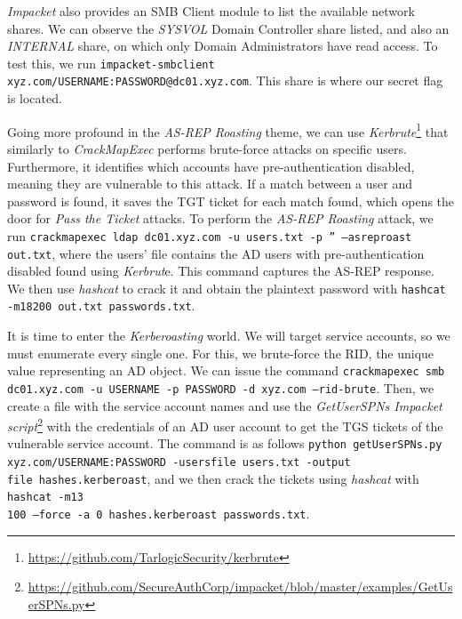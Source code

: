\textit{Impacket} also provides an SMB Client module to list the available network shares. We can observe the \textit{SYSVOL} Domain Controller share listed, and also an \textit{INTERNAL} share, on which only Domain Administrators have read access. To test this, we run \texttt{impacket-smbclient xyz.com/USERNAME:PASSWORD@dc01.xyz.com}. This share is where our secret flag is located. 

Going more profound in the \textit{AS-REP Roasting} theme, we can use \textit{Kerbrute}\footnote{\url{https://github.com/TarlogicSecurity/kerbrute}} that similarly to \textit{CrackMapExec} performs brute-force attacks on specific users. Furthermore, it identifies which accounts have pre-authentication disabled, meaning they are vulnerable to this attack. If a match between a user and password is found, it saves the TGT ticket for each match found, which opens the door for \textit{Pass the Ticket} attacks. To perform the \textit{AS-REP Roasting} attack, we run \texttt{crackmapexec ldap dc01.xyz.com -u users.txt -p '' ---asreproast out.txt}, where the users' file contains the AD users with pre-authentication disabled found using \textit{Kerbrut}e. This command captures the AS-REP response. We then use \textit{hashcat} to crack it and obtain the plaintext password with \texttt{hashcat -m18200 out.txt passwords.txt}. 

It is time to enter the \textit{Kerberoasting} world. We will target service accounts, so we must enumerate every single one. For this, we brute-force the RID, the unique value representing an AD object. We can issue the command \texttt{crackmapexec smb dc01.xyz.com -u USERNAME -p PASSWORD -d xyz.com ---rid-brute}. Then, we create a file with the service account names and use the \textit{GetUserSPNs Impacket script}\footnote{\url{https://github.com/SecureAuthCorp/impacket/blob/master/examples/GetUserSPNs.py}} with the credentials of an AD user account to get the TGS tickets of the vulnerable service account. The command is as follows \texttt{python getUserSPNs.py xyz.com/USERNAME:PASSWORD -usersfile users.txt -output\\file hashes.kerberoast}, and we then crack the tickets using \textit{hashcat} with \texttt{hashcat -m13\\100 ---force -a 0 hashes.kerberoast passwords.txt}.

